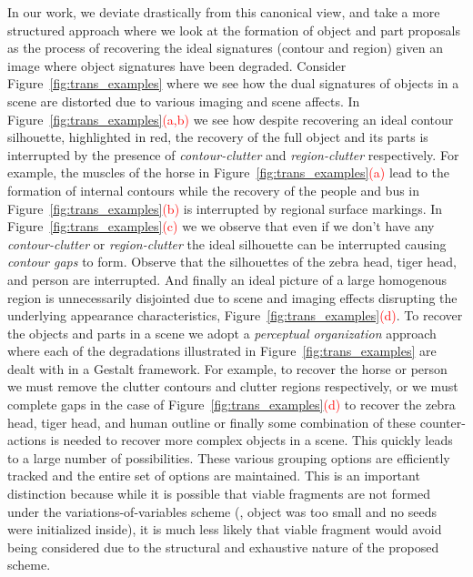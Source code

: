 In our work, we deviate drastically from this canonical view, and take a more structured approach where we look at the formation of object and part proposals as the process of recovering the ideal signatures (contour and region) given an image where object signatures have been degraded. Consider Figure~\ref{fig:trans_examples} where we see how the dual signatures of objects in a scene are distorted due to various imaging and scene affects. In Figure~\ref{fig:trans_examples}\textcolor{red}{(a,b)} we see how despite recovering an ideal contour silhouette, highlighted in red, the recovery of the full object and its parts is interrupted by the presence of \emph{contour-clutter} and \emph{region-clutter} respectively. For example, the muscles of the horse in Figure~\ref{fig:trans_examples}\textcolor{red}{(a)} lead to the formation of internal contours while the recovery of the people and bus in Figure~\ref{fig:trans_examples}\textcolor{red}{(b)} is interrupted by regional surface markings. In Figure~\ref{fig:trans_examples}\textcolor{red}{(c)} we we observe that even if we don't have any \emph{contour-clutter} or \emph{region-clutter} the ideal silhouette can be interrupted causing \emph{contour gaps} to form. Observe that the silhouettes of the zebra head, tiger head, and person are interrupted. And finally an ideal picture of a large homogenous region is unnecessarily disjointed due to scene and imaging effects disrupting the underlying appearance characteristics, Figure~\ref{fig:trans_examples}\textcolor{red}{(d)}. To recover the objects and parts in a scene we adopt a \emph{perceptual organization} approach where each of the degradations illustrated in Figure~\ref{fig:trans_examples} are dealt with in a Gestalt framework. For example, to recover the horse or person we must remove the clutter contours and clutter regions respectively, or we must complete gaps in the case of Figure~\ref{fig:trans_examples}\textcolor{red}{(d)} to recover the zebra head, tiger head, and human outline or finally some combination of these counter-actions is needed to recover more complex objects in a scene. This quickly leads to a large number of possibilities. These various grouping options are efficiently tracked and the entire set of options are maintained. This is an important distinction because while it is possible that viable fragments are not formed under the variations-of-variables scheme (\eg, object was too small and no seeds were initialized inside), it is much less likely that viable fragment would avoid being considered due to the structural and exhaustive nature of the proposed scheme. 

